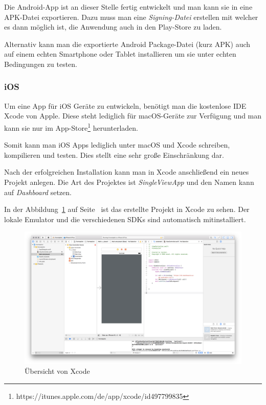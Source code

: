 Die Android-App ist an dieser Stelle fertig entwickelt und man kann sie in eine APK-Datei exportieren. Dazu muss man
eine \textit{Signing-Datei} erstellen mit welcher es dann möglich ist, die Anwendung auch in den Play-Store zu laden.

Alternativ kann man die exportierte Android Package-Datei (kurz APK) auch auf einem echten Smartphone oder Tablet
installieren um sie unter echten Bedingungen zu testen.

\subsubsection{iOS}
Um eine App für iOS Geräte zu entwickeln, benötigt man die kostenlose IDE Xcode von Apple. Diese steht lediglich für
macOS-Geräte zur Verfügung und man kann sie nur im
App-Store\footnote{https://itunes.apple.com/de/app/xcode/id497799835} herunterladen.

Somit kann man iOS Apps lediglich unter macOS und Xcode schreiben, kompilieren und testen. Dies stellt eine sehr große
Einschränkung dar.

Nach der erfolgreichen Installation kann man in Xcode anschließend ein neues Projekt anlegen. Die Art des Projektes ist
\textit{SingleViewApp} und den Namen kann auf \textit{Dashboard} setzen.

In der Abbildung~\ref{fig:umsetzung_ios_ide} auf Seite~\pageref{fig:umsetzung_ios_ide} ist das erstellte Projekt in
Xcode zu sehen. Der lokale Emulator und die verschiedenen SDKs sind automatisch mitinstalliert.

\begin{figure}[h]
    \centering
    \includegraphics[width=\textwidth]{images/kapitel_4/ios_ide.png}
    \caption{Übersicht von Xcode}
    \label{fig:umsetzung_ios_ide}
\end{figure}

